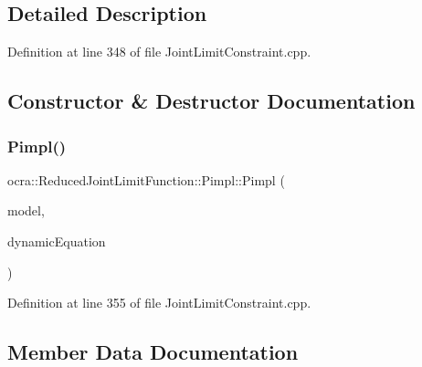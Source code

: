 \subsection{Detailed Description}


Definition at line 348 of file Joint\+Limit\+Constraint.\+cpp.



\subsection{Constructor \& Destructor Documentation}
\hypertarget{structReducedJointLimitFunction_1_1Pimpl_a144b5331a7812ad5859215d57f8fd250}{}\label{structReducedJointLimitFunction_1_1Pimpl_a144b5331a7812ad5859215d57f8fd250} 
\subsubsection{\texorpdfstring{Pimpl()}{Pimpl()}}
{\footnotesize\ttfamily ocra\+::\+Reduced\+Joint\+Limit\+Function\+::\+Pimpl\+::\+Pimpl (\begin{DoxyParamCaption}\item[{const Model \&}]{model,  }\item[{const \hyperlink{classocra_1_1FullDynamicEquationFunction}{Full\+Dynamic\+Equation\+Function} \&}]{dynamic\+Equation }\end{DoxyParamCaption})\hspace{0.3cm}{\ttfamily [inline]}}



Definition at line 355 of file Joint\+Limit\+Constraint.\+cpp.



\subsection{Member Data Documentation}
\hypertarget{structReducedJointLimitFunction_1_1Pimpl_ad483380d3fcdd2da03a85d22947cf31d}{}\label{structReducedJointLimitFunction_1_1Pimpl_ad483380d3fcdd2da03a85d22947cf31d} 
